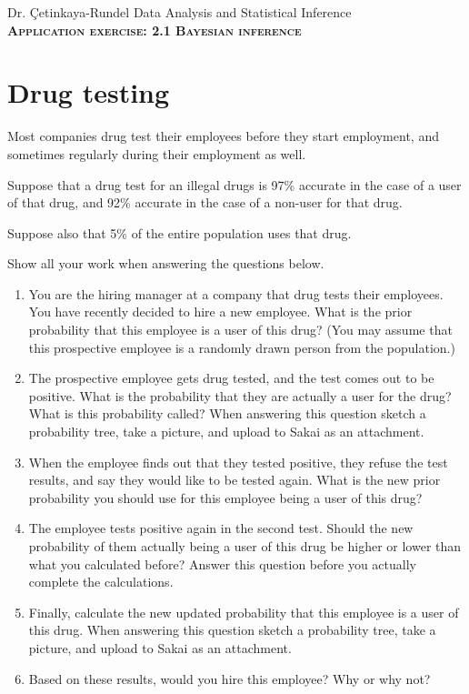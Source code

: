 \documentclass[11pt]{article}
\newcommand{\ttl}[1]{ \textsc{{\LARGE \textbf{{\color{oiB} #1} } }}}
\begin{document}
Dr. \c{C}etinkaya-Rundel \hfill Data Analysis and Statistical Inference \\

\ttl{Application exercise: 2.1 Bayesian inference} 

\section*{Drug testing}

Most companies drug test their employees before they start employment, and sometimes regularly during their employment as well.

Suppose that a drug test for an illegal drugs is 97\% accurate in the case of a user of that drug, and 92\% accurate in the case of a non-user for that drug.

Suppose also that 5\% of the entire population uses that drug.

Show all your work when answering the questions below.

\begin{enumerate}

\item You are the hiring manager at a company that drug tests their employees. You have recently decided to hire a new employee. What is the prior probability that this employee is a user of this drug? (You may assume that this prospective employee is a randomly drawn person from the population.)

\item The prospective employee gets drug tested, and the test comes out to be positive. What is the probability that they are actually a user for the drug? What is this probability called? When answering this question sketch a probability tree, take a picture, and upload to Sakai as an attachment.

\item When the employee finds out that they tested positive, they refuse the test results, and say they would like to be tested again. What is the new prior probability you should use for this employee being a user of this drug?

\item The employee tests positive again in the second test. Should the new probability of them actually being a user of this drug be higher or lower than what you calculated before? Answer this question before you actually complete the calculations.

\item Finally, calculate the new updated probability that this employee is a user of this drug. When answering this question sketch a probability tree, take a picture, and upload to Sakai as an attachment.

\item Based on these results, would you hire this employee? Why or why not?

\end{enumerate}

%
\end{document}
